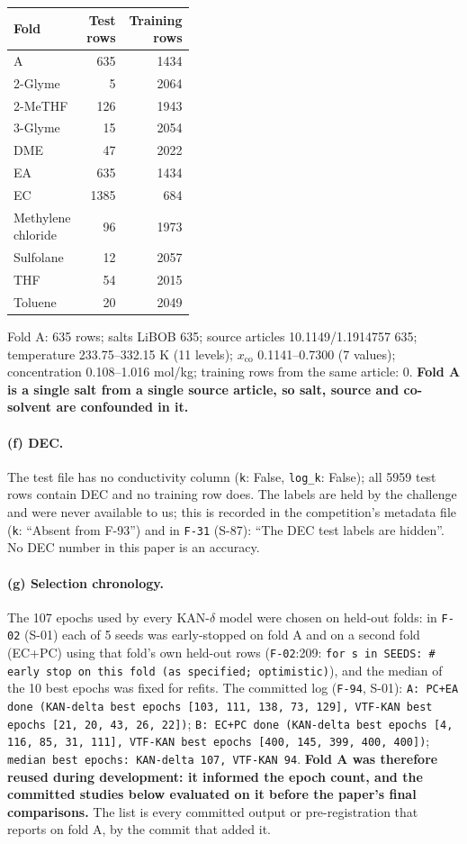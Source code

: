 {\footnotesize\setlength{\tabcolsep}{3pt}
\begin{longtable}{R{0.4\linewidth} r r}
\toprule
Fold & Test rows & Training rows \\
\midrule
\endhead
A & 635 & 1434 \\
2-Glyme & 5 & 2064 \\
2-MeTHF & 126 & 1943 \\
3-Glyme & 15 & 2054 \\
DME & 47 & 2022 \\
EA & 635 & 1434 \\
EC & 1385 & 684 \\
Methylene chloride & 96 & 1973 \\
Sulfolane & 12 & 2057 \\
THF & 54 & 2015 \\
Toluene & 20 & 2049 \\
\bottomrule
\end{longtable}}
Fold A: 635 rows; salts LiBOB 635; source articles 10.1149/1.1914757 635; temperature 233.75--332.15 K (11 levels); $x_{\mathrm{co}}$ 0.1141--0.7300 (7 values); concentration 0.108--1.016 mol/kg; training rows from the same article: 0. \textbf{Fold A is a single salt from a single source article, so salt, source and co-solvent are confounded in it.}

\paragraph{(f) DEC.} The test file has no conductivity column (\texttt{k}: False, \texttt{log\_k}: False); all 5959 test rows contain DEC and no training row does. The labels are held by the challenge and were never available to us; this is recorded in the competition's metadata file (\texttt{k}: ``Absent from F-93'') and in \texttt{F-31} (S-87): ``The DEC test labels are hidden''. No DEC number in this paper is an accuracy.

\paragraph{(g) Selection chronology.} The 107 epochs used by every KAN-$\delta$ model were chosen on held-out folds: in \texttt{F-02} (S-01) each of 5 seeds was early-stopped on fold A and on a second fold (EC+PC) using that fold's own held-out rows (\texttt{F-02}:209: \texttt{for s in SEEDS:  \# early stop on this fold (as specified; optimistic)}), and the median of the 10 best epochs was fixed for refits. The committed log (\texttt{F-94}, S-01): \texttt{A: PC+EA done (KAN-delta best epochs [103, 111, 138, 73, 129], VTF-KAN best epochs [21, 20, 43, 26, 22])}; \texttt{B: EC+PC done (KAN-delta best epochs [4, 116, 85, 31, 111], VTF-KAN best epochs [400, 145, 399, 400, 400])}; \texttt{median best epochs: KAN-delta 107, VTF-KAN 94}. \textbf{Fold A was therefore reused during development: it informed the epoch count, and the committed studies below evaluated on it before the paper's final comparisons.} The list is every committed output or pre-registration that reports on fold A, by the commit that added it.

